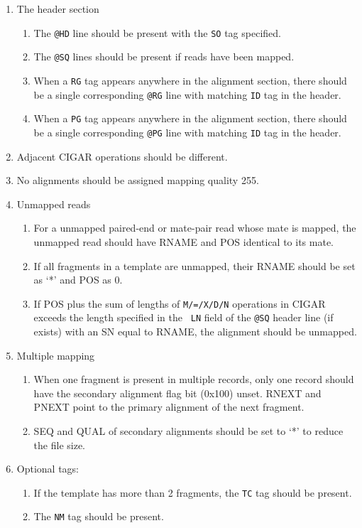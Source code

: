 \documentclass[10pt]{article}
\begin{document}
\begin{enumerate}
\item The header section
  \begin{enumerate}[label*=\arabic*]
  \item The {\tt @HD} line should be present with the {\tt SO} tag specified.
  \item The {\tt @SQ} lines should be present if reads have been mapped.
  \item When a {\tt RG} tag appears anywhere in the alignment section,
    there should be a single corresponding {\tt @RG} line with matching
    {\tt ID} tag in the header.
  \item When a {\tt PG} tag appears anywhere in the alignment section,
    there should be a single corresponding {\tt @PG} line with matching
    {\tt ID} tag in the header.
  \end{enumerate}
\item Adjacent CIGAR operations should be different.
\item No alignments should be assigned mapping quality 255.
\item Unmapped reads
  \begin{enumerate}[label*=\arabic*]
  \item For a unmapped paired-end or mate-pair read whose mate is
    mapped, the unmapped read should have {\sf RNAME} and {\sf POS}
    identical to its mate.
  \item If all fragments in a template are unmapped, their {\sf RNAME}
    should be set as `*' and {\sf POS} as 0.
  \item If {\sf POS} plus the sum of lengths of {\tt M/=/X/D/N}
    operations in {\sf CIGAR} exceeds the length specified in the {\tt
      LN} field of the {\tt @SQ} header line (if exists) with an SN
    equal to {\sf RNAME}, the alignment should be unmapped.
  \end{enumerate}
\item Multiple mapping
  \begin{enumerate}[label*=\arabic*]
  \item When one fragment is present in multiple records, only one
    record should have the secondary alignment flag bit (0x100)
    unset. {\sf RNEXT} and {\sf PNEXT} point to the primary alignment of
    the next fragment.
  \item {\sf SEQ} and {\sf QUAL} of secondary alignments should be set
    to `*' to reduce the file size.
  \end{enumerate}
\item Optional tags:
  \begin{enumerate}[label*=\arabic*]
  \item If the template has more than 2 fragments, the {\tt TC} tag
    should be present.
  \item The {\tt NM} tag should be present.
  \end{enumerate}
\end{enumerate}
\end{document}
